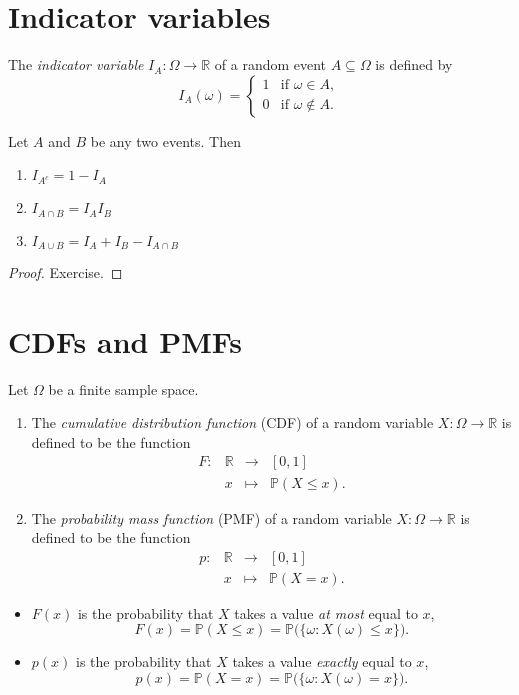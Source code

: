 \documentclass[lecture]{csm}
\newcommand{\R}{\mathbb{R}}
\newcommand{\prob}{\mathbb{P}}
\def\it{\item}
\def\bit{\begin{itemize}}
\def\eit{\end{itemize}}
\def\ben{\begin{enumerate}}
\def\een{\end{enumerate}}
\begin{document}
\newpage
\section{Indicator variables}

\begin{definition}
The \emph{indicator variable} $I_A:\Omega\to\R$ of a random event $A\subseteq\Omega$ is defined by
\[
I_A(\omega) = 
	\left\{
	\begin{array}{ll}
	1 & \text{if } \omega\in A, \\
	0 & \text{if } \omega\notin A.
	\end{array}
	\right.
\]
\end{definition}

\begin{theorem}
Let $A$ and $B$ be any two events. Then
\ben
\it $I_{A^c} = 1 - I_A$
\it $I_{A\cap B} = I_A I_B$
\it $I_{A\cup B} = I_A + I_B - I_{A\cap B}$
\een
\end{theorem}
\begin{proof}
Exercise.
\end{proof}


\section{CDFs and PMFs}
\begin{definition}
Let $\Omega$ be a finite sample space.%
\ben
\it
The \emph{cumulative distribution function} (CDF) of a random variable $X:\Omega\to\R$ is defined to be the function
\[
\begin{array}{cccl}
F:	& \mathbb{R}	& \longrightarrow	& [0,1] \\
	& x 			& \mapsto			& \prob(X\leq x).
\end{array}
\]
\it
The \emph{probability mass function} (PMF) of a random variable $X:\Omega\to\R$ is defined to be the function
\[
\begin{array}{cccl}
p:	& \mathbb{R}	& \longrightarrow	& [0,1] \\
	& x 			& \mapsto			& \prob(X = x).
\end{array}
\]
\een
\end{definition}
\bit
\it $F(x)$ is the probability that $X$ takes a value \emph{at most} equal to $x$,
\[
F(x) = \prob(X\leq x) = \prob\big(\{\omega:X(\omega)\leq x\}\big).
\]
\it $p(x)$ is the probability that $X$ takes a value \emph{exactly} equal to $x$,
\[
p(x) = \prob(X=x) = \prob\big(\{\omega:X(\omega)= x\}\big).
\]
\eit
\end{document}
